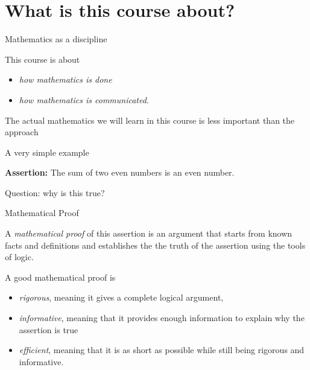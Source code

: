 \documentclass[ignorenonframetext,]{beamer}
\providecommand{\tightlist}{%
  \setlength{\itemsep}{0pt}\setlength{\parskip}{0pt}}
\begin{document}
\hypertarget{what-is-this-course-about}{%
\section{What is this course about?}\label{what-is-this-course-about}}

\begin{frame}{Mathematics as a discipline}
\protect\hypertarget{mathematics-as-a-discipline}{}

This course is about

\begin{itemize}
\tightlist
\item
  \emph{how mathematics is done}
\item
  \emph{how mathematics is communicated}.
\end{itemize}

The actual mathematics we will learn in this course is less important
than the approach

\end{frame}

\begin{frame}{A very simple example}
\protect\hypertarget{a-very-simple-example}{}

\textbf{Assertion:} The sum of two even numbers is an even number.

Question: why is this true?

\end{frame}

\begin{frame}{Mathematical Proof}
\protect\hypertarget{mathematical-proof}{}

A \emph{mathematical proof} of this assertion is an argument that starts
from known facts and definitions and establishes the the truth of the
assertion using the tools of logic.

A good mathematical proof is

\begin{itemize}
\tightlist
\item
  \emph{rigorous}, meaning it gives a complete logical argument,
\item
  \emph{informative}, meaning that it provides enough information to
  explain why the assertion is true
\item
  \emph{efficient}, meaning that it is as short as possible while still
  being rigorous and informative.
\end{itemize}

\end{frame}
\end{document}
